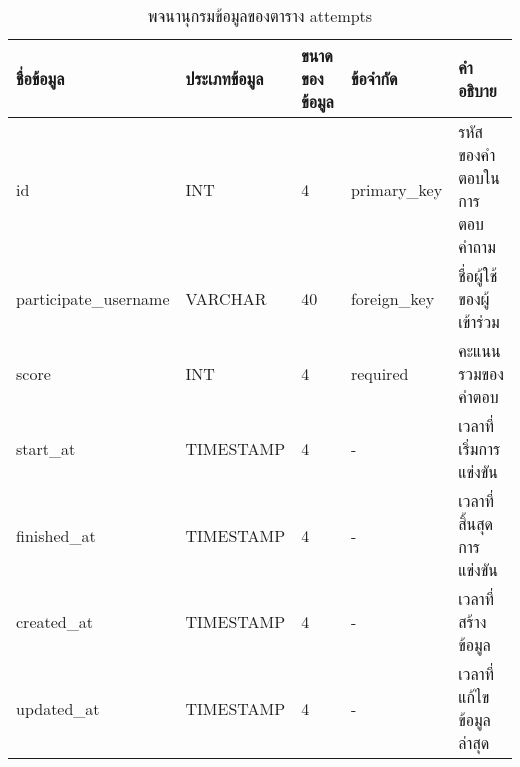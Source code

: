 \begin{table}[H]
    \caption{พจนานุกรมข้อมูลของตาราง attempts}
    \label{tab:database-attempts}
    \begin{tabularx}{\textwidth}{ | p{2.25cm} | p{2.20cm} | p{2.45cm} | p{2cm} | X | }
    \hline
    \textbf{ชื่อข้อมูล} & \textbf{ประเภทข้อมูล} & \textbf{ขนาดของข้อมูล} & \textbf{ข้อจำกัด} & \textbf{คำอธิบาย} \\
    \hline
    id & INT & 4 & primary\_key & รหัสของคำตอบในการตอบคำถาม \\
    \hline
    participate\_username & VARCHAR & 40 & foreign\_key & ชื่อผู้ใช้ของผู้เข้าร่วม \\
    \hline
    score & INT & 4 & required & คะแนนรวมของคำตอบ \\
    \hline
    start\_at & TIMESTAMP & 4 & - & เวลาที่เริ่มการแข่งขัน \\
    \hline
    finished\_at & TIMESTAMP & 4 & - & เวลาที่สิ้นสุดการแข่งขัน \\
    \hline
    created\_at & TIMESTAMP & 4 & - & เวลาที่สร้างข้อมูล \\
    \hline
    updated\_at & TIMESTAMP & 4 & - & เวลาที่แก้ไขข้อมูลล่าสุด \\
    \hline
    \end{tabularx}
\end{table}